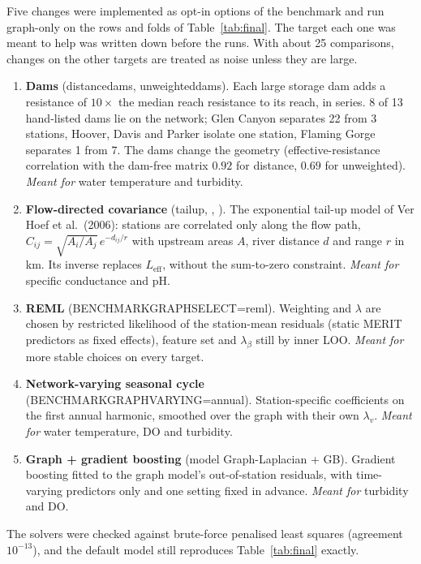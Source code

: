 \documentclass[11pt]{article}
\newcommand{\codeus}{\textunderscore\allowbreak}
\newcommand{\code}[1]{{\ttfamily\let\_\codeus #1}}
\begin{document}
Five changes were implemented as opt-in options of the benchmark and run graph-only on the rows and
folds of Table~\ref{tab:final}. The target each one was meant to help was written down before the
runs. With about 25 comparisons, changes on the other targets are treated as noise unless they are
large.
\begin{enumerate}
  \item \textbf{Dams} (\code{distance\_dams}, \code{unweighted\_dams}). Each large storage dam adds a
        resistance of $10\times$ the median reach resistance to its reach, in series. 8 of 13
        hand-listed dams lie on the network; Glen Canyon separates 22 from 3 stations, Hoover, Davis
        and Parker isolate one station, Flaming Gorge separates 1 from 7. The dams change the
        geometry (effective-resistance correlation with the dam-free matrix $0.92$ for distance,
        $0.69$ for unweighted). \emph{Meant for} water temperature and turbidity.
  \item \textbf{Flow-directed covariance} (\code{tailup\_100}, \code{\_300}, \code{\_1000}). The
        exponential tail-up model of Ver Hoef et al.\ (2006): stations are correlated only along the
        flow path, $C_{ij}=\sqrt{A_i/A_j}\,e^{-d_{ij}/r}$ with upstream areas $A$, river distance
        $d$ and range $r$ in km. Its inverse replaces $L_{\text{eff}}$, without the sum-to-zero
        constraint. \emph{Meant for} specific conductance and pH.
  \item \textbf{REML} (\code{BENCHMARK\_GRAPH\_SELECT=reml}). Weighting and $\lambda$ are chosen by
        restricted likelihood of the station-mean residuals (static MERIT predictors as fixed
        effects), feature set and $\lambda_\beta$ still by inner LOO. \emph{Meant for} more stable
        choices on every target.
  \item \textbf{Network-varying seasonal cycle} (\code{BENCHMARK\_GRAPH\_VARYING=annual}).
        Station-specific coefficients on the first annual harmonic, smoothed over the graph with
        their own $\lambda_v$. \emph{Meant for} water temperature, DO and turbidity.
  \item \textbf{Graph + gradient boosting} (model \code{Graph-Laplacian + GB}). Gradient boosting
        fitted to the graph model's out-of-station residuals, with time-varying predictors only and
        one setting fixed in advance. \emph{Meant for} turbidity and DO.
\end{enumerate}
The solvers were checked against brute-force penalised least squares (agreement $10^{-13}$), and the
default model still reproduces Table~\ref{tab:final} exactly.
\end{document}
